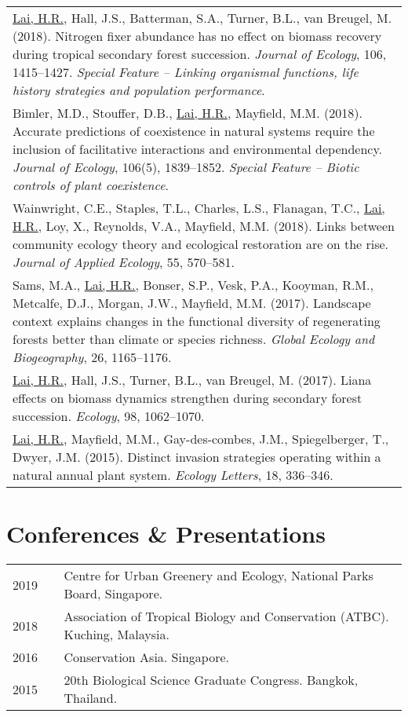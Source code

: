 \documentclass[a4paper]{article}
\begin{document}
\begin{tabular}{p{\linewidth}}
\hangindent=1cm \underline{Lai, H.R.}, Hall, J.S., Batterman, S.A., Turner, B.L., van Breugel, M. (2018). Nitrogen fixer abundance has no effect on biomass recovery during tropical secondary forest succession. \textit{Journal of Ecology}, 106, 1415--1427. \textit{Special Feature -- Linking organismal functions, life history strategies and population performance}. \\

\hangindent=1cm Bimler, M.D., Stouffer, D.B., \underline{Lai, H.R.}, Mayfield, M.M. (2018). Accurate predictions of coexistence in natural systems require the inclusion of facilitative interactions and environmental dependency. \textit{Journal of Ecology}, 106(5), 1839--1852. \textit{Special Feature -- Biotic controls of plant coexistence}.\\

\hangindent=1cm Wainwright, C.E., Staples, T.L., Charles, L.S., Flanagan, T.C., \underline{Lai, H.R.}, Loy, X., Reynolds, V.A., Mayfield, M.M. (2018). Links between community ecology theory and ecological restoration are on the rise. \textit{Journal of Applied Ecology}, 55, 570--581.\\

\hangindent=1cm Sams, M.A., \underline{Lai, H.R.}, Bonser, S.P., Vesk, P.A., Kooyman, R.M., Metcalfe, D.J., Morgan, J.W., Mayfield, M.M. (2017). Landscape context explains changes in the functional diversity of regenerating forests better than climate or species richness. \textit{Global Ecology and Biogeography}, 26, 1165--1176. \\

\hangindent=1cm \underline{Lai, H.R.}, Hall, J.S., Turner, B.L., van Breugel, M. (2017). Liana effects on biomass dynamics strengthen during secondary forest succession. \textit{Ecology}, 98, 1062--1070. \\

\hangindent=1cm \underline{Lai, H.R.}, Mayfield, M.M., Gay-des-combes, J.M., Spiegelberger, T., Dwyer, J.M. (2015). Distinct invasion strategies operating within a natural annual plant system. \textit{Ecology Letters}, 18, 336--346. \\

\end{tabular}

\section*{Conferences \& Presentations}
\begin{tabular}{p{0.13\linewidth} p{0.87\linewidth}}
2019 & Centre for Urban Greenery and Ecology, National Parks Board, Singapore. \\
2018 & Association of Tropical Biology and Conservation (ATBC). Kuching, Malaysia. \\
2016 & Conservation Asia. Singapore. \\
2015 & 20th Biological Science Graduate Congress. Bangkok, Thailand. \\
\end{tabular}
\end{document}
